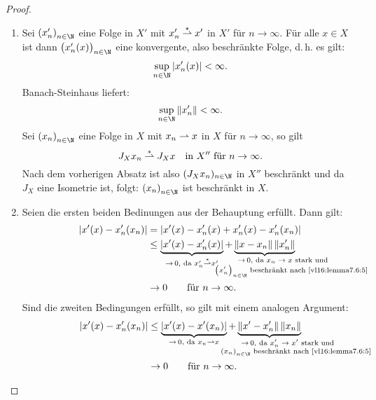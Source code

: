 \begin{proof}
\begin{enumerate}[(1)]
        \item
            Sei $\nSeq{x'}$ eine Folge in $X'$ mit $x'_n \overset*{\rightharpoonup} x'$ in $X'$
            für $n\to\infty$. Für alle $x\in X$ ist dann
            $\bigl( x'_n(x) \bigr)_{n\in\N}$ eine konvergente, also beschränkte
            Folge, d.\,h. es gilt:
            \[ \sup_{n\in\N} \, \abs*{x_n'(x)} < \infty  . \]
            Banach-Steinhaus  liefert:
            \[ \sup_{n\in\N} \, \norm{x_n'} < \infty  . \]
            Sei $\nSeq x$ eine Folge in $X$ mit $x_n \rightharpoonup x$ in $X$ für
            $n\to\infty$, so gilt
            \[ J_X x_n \overset*{\rightharpoonup} J_X x \quad\text{in $X''$ für $n\to\infty$}. \]
            Nach dem vorherigen Absatz ist also $(J_X x_n)_{n\in\N}$ in $X''$
            beschränkt und da $J_X$ eine Isometrie ist, folgt: $\nSeq x$ ist
            beschränkt in $X$.
            
        \item
            Seien die ersten beiden Bedinungen aus der Behauptung erfüllt. Dann
            gilt:
            \begin{align*}
                \abs*{x'(x)-x_n'(x_n)}
                &= \abs*{x'(x)-x_n'(x)+x_n'(x)-x_n'(x_n)}
                \\
                &\leq 
                    \underbrace{\abs*{x'(x)-x_n'(x)}}_{
                        \to\, 0,\text{ da } x_n' \weakstarto x'
                    }
                    + \underbrace{\norm{x-x_n} \, \norm{x_n'}}_{
                    \mathclap{\substack{\hspace{1.3cm}
                        \to\, 0, \text{ da $x_n\to x$ stark und}\\
                        \hspace{1.9cm}
                        \text{$\nSeq{x'}$ beschränkt nach \ref{vl16:lemma7.6:5}}
                    }}}
                \\
                &\to 0 \fuer n\to\infty
            . \end{align*}
            \smallskip
            Sind die zweiten Bedingungen erfüllt, so gilt mit einem analogen
            Argument:
            \begin{align*}
                \abs*{x'(x)-x_n'(x_n)}
                &\leq 
                    \underbrace{\abs*{x'(x)-x'(x_n)}}_{
                        \to\, 0,\text{ da } x_n \weakto x
                    }
                    + \underbrace{\norm{x'-x'_n} \, \norm{x_n}}_{
                    \mathclap{\substack{\hspace{1.3cm}
                        \to\, 0, \text{ da $x'_n\to x'$ stark und}\\
                        \hspace{1.9cm}
                        \text{$\nSeq x$ beschränkt nach \ref{vl16:lemma7.6:5}}
                    }}}
                \\
                &\to 0 \fuer n\to\infty
                . \end{align*}
    \end{enumerate}
\end{proof}

